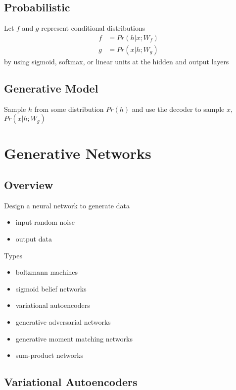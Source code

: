 \documentclass[]{article}
\theoremstyle{definition}
\begin{document}
\subsection{Probabilistic}
\label{sub:probabilistic}
Let $f$ and $g$ represent conditional distributions
\begin{align*}
    f &= Pr(h | x; W_f) \\
    g &= Pr(x | h; W_g)
\end{align*}
by using sigmoid, softmax, or linear units at the hidden and output layers

\subsection{Generative Model}
\label{sub:generative_model}

Sample $h$ from some distribution $Pr(h)$ and use the decoder to sample $x$, $Pr(x | h; W_g)$

\section{Generative Networks}
\label{sec:generative_networks}

\subsection{Overview}
\label{sub:overview}
Design a neural network to generate data
\begin{itemize}
    \item input random noise
    \item output data
\end{itemize}

Types
\begin{itemize}
    \item boltzmann machines
    \item sigmoid belief networks
    \item variational autoencoders
    \item generative adversarial networks
    \item generative moment matching networks
    \item sum-product networks
\end{itemize}


\subsection{Variational Autoencoders}
\label{sub:variational_autoencoders}
\end{document}
